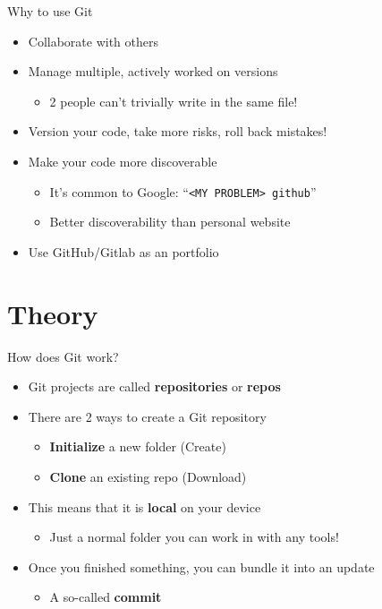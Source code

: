 \documentclass[compress,aspectratio=169]{beamer}
\begin{document}
  \begin{frame}{Why to use Git}
    \begin{itemize}
      \item Collaborate with others
        \pause
      \item Manage multiple, actively worked on versions
        \begin{itemize}
          \item 2 people can't trivially write in the same file!
        \end{itemize}
        \pause
      \item Version your code, take more risks, roll back mistakes!
        \pause
      \item Make your code more discoverable
        \begin{itemize}
          \item It's common to Google: ``\texttt{<MY PROBLEM> github}''
          \item Better discoverability than personal website
        \end{itemize}
        \pause
      \item Use GitHub/Gitlab as an portfolio
    \end{itemize}
  \end{frame}

	\section{Theory}

	\begin{frame}{How does Git work?}
		\begin{itemize}
      \item Git projects are called \textbf{repositories} or \textbf{repos}
      \item There are 2 ways to create a Git repository
        \begin{itemize}
          \item \textbf{Initialize} a new folder (Create)
          \item \textbf{Clone} an existing repo (Download)
        \end{itemize}
      \item This means that it is \textbf{local} on your device
        \begin{itemize}
          \item Just a normal folder you can work in with any tools!
        \end{itemize}
      \item Once you finished something, you can bundle it into an update
        \begin{itemize}
          \item A so-called \textbf{commit}
        \end{itemize}
		\end{itemize}
	\end{frame}
\end{document}

